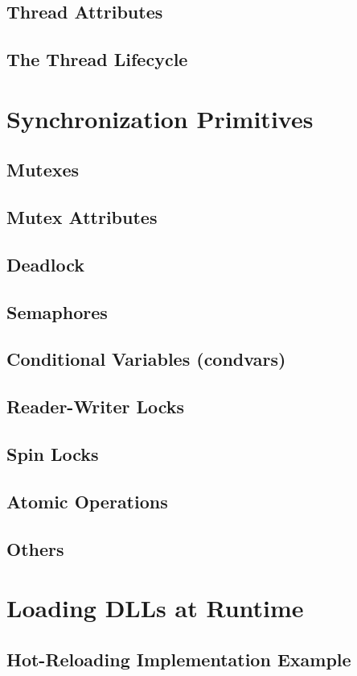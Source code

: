 \documentclass{article}
\begin{document}
\subsection{Thread Attributes}

\subsection{The Thread Lifecycle}

\section{Synchronization Primitives}

\subsection{Mutexes}

\subsection{Mutex Attributes}

\subsection{Deadlock}

\subsection{Semaphores}

\subsection{Conditional Variables (condvars)}

\subsection{Reader-Writer Locks}

\subsection{Spin Locks}

\subsection{Atomic Operations}

\subsection{Others}

\section{Loading DLLs at Runtime}

\subsection{Hot-Reloading Implementation Example}
\end{document}
